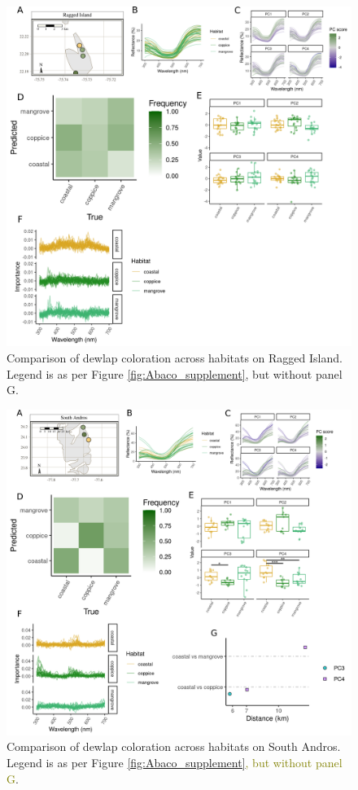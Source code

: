 \pagebreak

\begin{figure}[H]
	\centering
	\includegraphics[width=\textwidth]{figures/RaggedIsland_supplement.png}
	\caption{Comparison of dewlap coloration across habitats on Ragged Island. Legend is as per Figure \ref{fig:Abaco_supplement}, but without panel G.}
	\label{fig:RaggedIsland}
\end{figure}

\pagebreak

\begin{figure}[H]
	\centering
	\includegraphics[width=\textwidth]{figures/SouthAndros_supplement.png}
	\caption{Comparison of dewlap coloration across habitats on South Andros. Legend is as per Figure \ref{fig:Abaco_supplement}\textcolor{olive}{, but without panel G}.}
	\label{fig:SouthAndros}
\end{figure}

